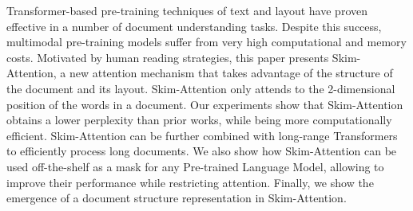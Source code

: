 Transformer-based pre-training techniques of text and layout have proven effective in a number of document understanding tasks. Despite this success, multimodal pre-training models suffer from very high computational and memory costs. Motivated by human reading strategies, this paper presents Skim-Attention, a new attention mechanism that takes advantage of the structure of the document and its layout. Skim-Attention only attends to the 2-dimensional position of the words in a document. Our experiments show that Skim-Attention obtains a lower perplexity than prior works, while being more computationally efficient. Skim-Attention can be further combined with long-range Transformers to efficiently process long documents. We also show how Skim-Attention can be used off-the-shelf as a mask for any Pre-trained Language Model, allowing to improve their performance while restricting attention. Finally, we show the emergence of a document structure representation in Skim-Attention.
